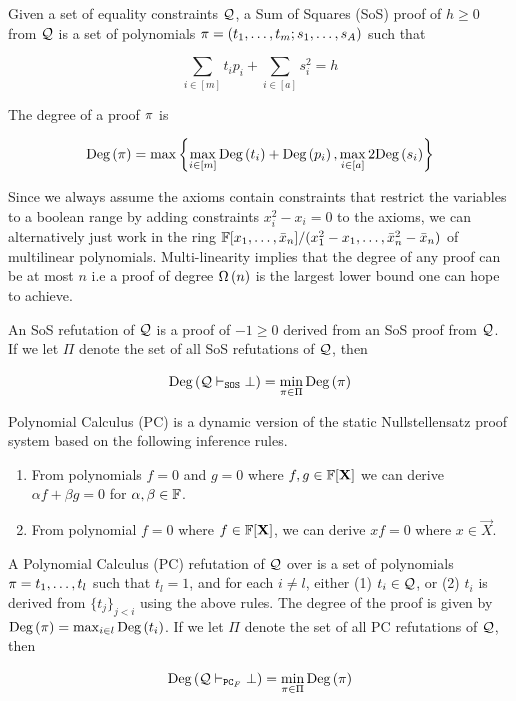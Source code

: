 \documentclass[11pt]{article}
\begin{document}
\begin{definition}\label{def:sum-of-squares} Given a set of equality constraints $\mathcal{Q}$, a Sum of Squares (SoS) proof of $h \geq 0$ from $\mathcal{Q}$ is a set of polynomials $\pi = (t_1, \dots, t_m; s_1, \dots, s_A)$ such that

\[ \sum_{i \in [m]} t_ip_i+ \sum_{i \in [a]} s_i^2 = h\]

The degree of a proof $\pi$ is

\[ \text{Deg}\left(\pi\right) = \max\left\{\max_{i \in [m]} \text{Deg}\left(t_i\right) + \text{Deg}\left(p_i\right), \max_{i \in [a]} 2\text{Deg}\left(s_i\right)\right\}\]


\end{definition}

Since we always assume the axioms contain constraints that restrict the variables to a boolean range by adding constraints $x_i^2 - x_i=0$ to the axioms, we can alternatively just work in the ring $\mathbb{F}[x_1, \dots, \bar{x}_n]/(x_1^2 - x_1, \dots, \bar{x}_n^2 - \bar{x}_n)$ of multilinear polynomials.
Multi-linearity implies that the degree of any proof can be at most $n$ i.e a proof of degree $\Omega\left(n\right)$ is the largest lower bound one can hope to achieve.

\begin{definition}
An SoS refutation of $\mathcal{Q}$ is a proof of $-1 \geq 0$ derived from an SoS proof from $\mathcal{Q}$. If we let $\Pi$ denote the set of all SoS refutations of $\mathcal{Q}$, then

\[ \text{Deg}\left(\mathcal{Q} \vdash_{\texttt{SOS}} \bot\right) = \min_{\pi \in \Pi}\text{Deg}\left(\pi\right)\]

\end{definition}

Polynomial Calculus (PC) is a dynamic version of the static Nullstellensatz proof system \citep[Section 1.3]{fleming2019semialgebraic} based on the following inference rules.
\begin{enumerate}
	\item From polynomials $f=0$ and $g=0$ where $f,g \in \mathbb{F}[\mathbf{X}]$ we can derive $\alpha f + \beta g = 0$ for $\alpha, \beta \in \mathbb{F}$.
	\item From polynomial $f=0$ where $f \in \mathbb{F}[\mathbf{X}]$, we can derive $xf=0$ where $x \in \vec{X}$.
\end{enumerate}

\begin{definition}\label{def:poly-calc-refutations}
A Polynomial Calculus (PC) refutation of $\mathcal{Q}$ over is a set of polynomials $\pi = t_1, \dots, t_l$	such that $t_l = 1$, and for each $i \neq l$, either (1) $t_i \in \mathcal{Q}$, or (2) $t_i$ is derived from $\{t_j\}_{j < i}$ using the above rules.
The degree of the proof is given by $\text{Deg}\left(\pi\right) = \max_{i \in l}\text{Deg}\left(t_i\right)$. If we let $\Pi$ denote the set of all PC refutations of $\mathcal{Q}$, then

\[ \text{Deg}\left(\mathcal{Q} \vdash_{\texttt{PC}_F} \bot\right) = \min_{\pi \in \Pi}\text{Deg}\left(\pi\right)\]
\end{definition}
\end{document}
